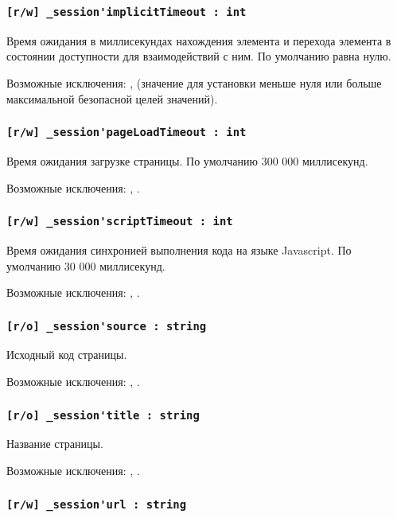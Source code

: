 \subsubsection{\lstinline|[r/w] _session'implicitTimeout : int|}

Время ожидания в миллисекундах нахождения элемента и перехода элемента в состоянии доступности для взаимодействий с ним. По умолчанию равна нулю.

Возможные исключения: ,  (значение для установки меньше нуля или больше максимальной безопасной целей значений).

\subsubsection{\lstinline|[r/w] _session'pageLoadTimeout : int|}

Время ожидания загрузке страницы. По умолчанию 300 000 миллисекунд.

Возможные исключения: , .

\subsubsection{\lstinline|[r/w] _session'scriptTimeout : int|}

Время ожидания синхронией выполнения кода на языке Javascript. По умолчанию 30 000 миллисекунд.

Возможные исключения: , .

\subsubsection{\lstinline|[r/o] _session'source : string|}

Исходный код страницы.

Возможные исключения: , .

\subsubsection{\lstinline|[r/o] _session'title : string|}

Название страницы.

Возможные исключения: , .

\subsubsection{\lstinline|[r/w] _session'url : string|}

